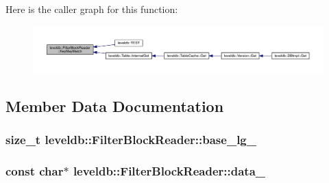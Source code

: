 Here is the caller graph for this function\+:\nopagebreak
\begin{figure}[H]
\begin{center}
\leavevmode
\includegraphics[width=350pt]{classleveldb_1_1_filter_block_reader_a2c1c0cd8311b99fd92d3548b7aa240d0_icgraph}
\end{center}
\end{figure}




\subsection{Member Data Documentation}
\hypertarget{classleveldb_1_1_filter_block_reader_a973563cd3780b9be717a8b60096ed232}{}
\subsubsection[{base\+\_\+lg\+\_\+}]{\setlength{\rightskip}{0pt plus 5cm}size\+\_\+t leveldb\+::\+Filter\+Block\+Reader\+::base\+\_\+lg\+\_\+\hspace{0.3cm}{\ttfamily [private]}}\label{classleveldb_1_1_filter_block_reader_a973563cd3780b9be717a8b60096ed232}
\hypertarget{classleveldb_1_1_filter_block_reader_a8bbb336aa6b2a278e276aae0420e9376}{}
\subsubsection[{data\+\_\+}]{\setlength{\rightskip}{0pt plus 5cm}const char$\ast$ leveldb\+::\+Filter\+Block\+Reader\+::data\+\_\+\hspace{0.3cm}{\ttfamily [private]}}\label{classleveldb_1_1_filter_block_reader_a8bbb336aa6b2a278e276aae0420e9376}
\hypertarget{classleveldb_1_1_filter_block_reader_a6805c65b69099abe85ec0863bdaf9842}{}
